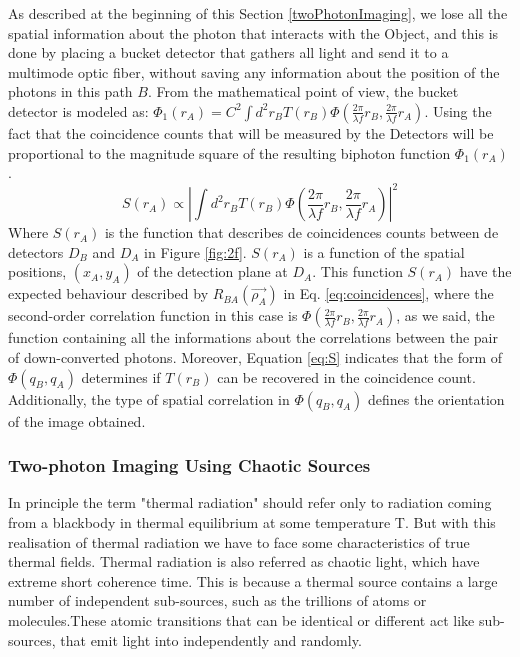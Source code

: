 As described at the beginning of this Section \ref{twoPhotonImaging}, we lose all the spatial information 
about the photon that interacts with the Object, and this is done by placing a bucket detector that
gathers all light and send it to a multimode optic fiber, without saving any information about the position
of the photons in this path $B$. From the mathematical point of view, the bucket detector is modeled
as: $\Phi_1 (r_A) = C^2 \int d^2 r_B T(r_B) \Phi (\frac{2 \pi}{\lambda f}r_B, \frac{2 \pi}{\lambda f}r_A)$.
Using the fact that the coincidence counts that will be measured by the Detectors will be 
proportional to the magnitude square of the resulting biphoton function $\Phi_1 (r_A)$\cite{introquantumoptics}.
\begin{equation}\label{eq:S}
S(r_A) \propto |  \int d^2 r_B T(r_B) \Phi (\frac{2 \pi}{\lambda f}r_B, \frac{2 \pi}{\lambda f}r_A) |^2
\end{equation}
Where $S(r_A)$ is the function that describes de coincidences counts between de detectors $D_B$ and 
$D_A$ in Figure \ref{fig:2f}. $S(r_A)$ is a function of the spatial positions, $(x_A,y_A)$
 of the detection plane at $D_A$. This function $S(r_A)$ have the expected behaviour described
by $R_{BA}(\vec{\rho_A})$ in Eq. \ref{eq:coincidences}, where the second-order correlation function in this 
case is $\Phi (\frac{2 \pi}{\lambda f}r_B, \frac{2 \pi}{\lambda f}r_A)$, as we said, the function
containing all the informations about the correlations between the pair of down-converted photons. 
Moreover, Equation \ref{eq:S} indicates that the form of $\Phi(q_B,q_A)$ determines if $T(r_B)$ can
be recovered in the coincidence count. Additionally, the type of spatial correlation in $\Phi(q_B,q_A)$
defines the orientation of the image obtained.

\subsubsection{Two-photon Imaging Using Chaotic Sources}

In principle the term "thermal radiation" should refer only to radiation coming 
from a blackbody in thermal equilibrium at some temperature T. But with this realisation of thermal radiation
we have to face some characteristics of true thermal fields. Thermal radiation is also referred as chaotic light, 
which have extreme short coherence time. This is because a thermal source contains a large number of independent sub-sources,
such as the trillions of atoms or molecules.These atomic transitions that can be identical or different
act like sub-sources, that emit light into independently and randomly. 



